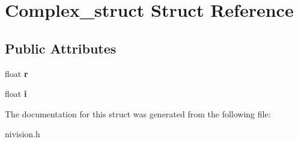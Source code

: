 \hypertarget{structComplex__struct}{\section{\-Complex\-\_\-struct \-Struct \-Reference}
\label{structComplex__struct}
}
\subsection*{\-Public \-Attributes}
\begin{DoxyCompactItemize}
\item 
\hypertarget{structComplex__struct_a88424f193812ce1778a0b77267e89032}{float {\bfseries r}}\label{structComplex__struct_a88424f193812ce1778a0b77267e89032}

\item 
\hypertarget{structComplex__struct_a5b3e7f7a844bac9fe6e5ebd6944d75a5}{float {\bfseries i}}\label{structComplex__struct_a5b3e7f7a844bac9fe6e5ebd6944d75a5}

\end{DoxyCompactItemize}


\-The documentation for this struct was generated from the following file\-:\begin{DoxyCompactItemize}
\item 
nivision.\-h\end{DoxyCompactItemize}
